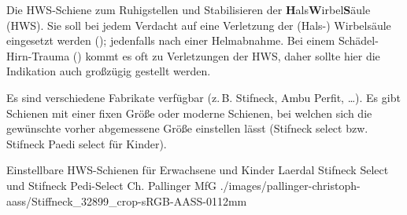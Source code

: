 

\Text{\TxBeschreibung}
{%
Die HWS-Schiene 
zum Ruhigstellen und Stabilisieren der {\bfseries
H}als{\bfseries W}irbel{\bfseries S}äule (HWS). Sie soll bei
jedem Verdacht auf eine Verletzung der (Hals-) Wirbelsäule
eingesetzt werden (); jedenfalls nach einer Helmabnahme.
Bei einem Schädel-Hirn-Trauma () kommt es oft zu Verletzungen 
der HWS, daher sollte hier die Indikation auch großzügig gestellt werden.

Es sind verschiedene
Fabrikate verfügbar (z.\,B. Stifneck\texttrademark, Ambu Perfit{\texttrademark}, \ldots). 
Es gibt
Schienen mit einer fixen Größe oder moderne Schienen, bei
welchen sich die gewünschte vorher abgemessene Größe einstellen lässt
(Stifneck select{\texttrademark} bzw. Stifneck Paedi
select{\texttrademark} für Kinder).

}{

}
{}
{}
{}

\PictureWide
{Einstellbare HWS-Schienen für Erwachsene und Kinder}%
{Laerdal{\texttrademark} Stifneck Select{\texttrademark} und
Stifneck Pedi-Select{\texttrademark}}%
{}%
{Ch. Pallinger}%
{MfG}%
{./images/pallinger-christoph-aass/Stiffneck_32899_crop-sRGB-AASS-0112mm}%
{}%
{}%


